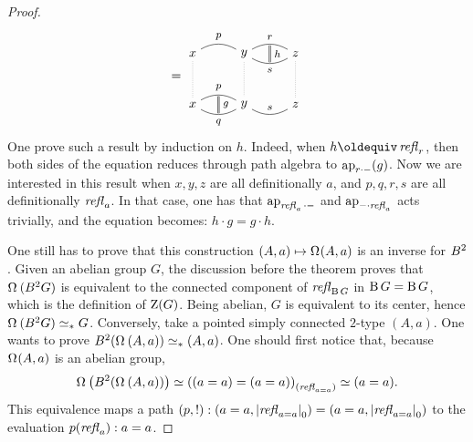 \begin{proof}
\begin{displaymath}
    =%
    \begin{tikzpicture}[node distance=4em, baseline=(basenode.base)]
      \node[] (x1) {$x$};
      \node[right of=x1] (y1) {$y$};
      \node[right of=y1] (z1) {$z$};
      \node[below of=x1] (x2) {$x$};
      \node[right of=x2] (y2) {$y$};
      \node[right of=y2] (z2) {$z$};
      \draw[bend left] (x2) to node[above] (p) {\footnotesize$p$} (y2);
      \draw[bend right] (x2) to  node[below] (q1) {\footnotesize$q$} (y2);
      \draw[bend right] (y2) to node[above] (r1) {\footnotesize$s$} (z2);
      \draw[bend left] (y1) to node[above] (r2) {\footnotesize$r$} (z1);
      \draw[bend right] (y1) to  node[below] (s) {\footnotesize$s$} (z1);
      \draw[bend left] (x1) to node[above] (p2) {\footnotesize$p$} (y1);
      \draw[double, shorten >=.1em, shorten <=.1em] (p) to node[right] {\footnotesize$g$} (q1);
      \draw[double, shorten >=.1em, shorten <=.1em] (r2) to node[right] {\footnotesize$h$} (s);
      \draw[gray,densely dotted] (x1) to node (basenode){} (x2) (y1) to (y2) (z1) to (z2);
    \end{tikzpicture}%
  \end{displaymath}
  One prove such a result by induction on $h$. Indeed, when
  $h\jdeq \refl r$, then both sides of the equation reduces through
  path algebra to $\mathop{\mathrm{ap}_{r\cdot{-}}} (g)$. Now we are interested in
  this result when $x,y,z$ are all definitionally $a$, and $p,q,r,s$
  are all definitionally $\mathop{\mathit{refl}_{a}}$. In that case, one has that
  $\mathop{\mathrm{ap}_{\mathop{\mathit{refl}_{a}}\cdot {-}}}$ and $\mathop{\mathrm{ap}_{{-}\cdot\mathop{\mathit{refl}_{a}}}}$ acts
  trivially, and the equation becomes: $h\cdot g = g \cdot h$.

  One still has to prove that this construction
  $(A,a) \mapsto \loopspace (A,a)$ is an inverse for $B^2$. Given an
  abelian group $G$, the discussion before the theorem proves that
  $\loopspace {(\BB G)}$ is equivalent to the connected component of
  $\mathop{\mathit{refl}_{\operatorname{B} G}}$ in ${\operatorname{B} G}={\operatorname{B} G}$, which is the definition of
  $\operatorname{Z}(G)$. Being abelian, $G$ is equivalent to its center,
  hence $\loopspace {(\BB G)} \simeq_\ast G$. Conversely, take a
  pointed simply connected $2$-type $(A,a)$. One wants to prove
  $\BB (\loopspace {(A,a)}) \weq_\ast (A,a)$. One should first notice
  that, because $\loopspace (A,a)$ is an abelian group,
  \begin{equation}
    \label{eq:loopspace-A-abelian}%
    \loopspace \left( \BB (\loopspace {(A,a)}) \right)
    \weq \conncomp{((a=a)=(a=a))}{\refl{a=a}} \weq (a=a).
  \end{equation}
  This equivalence maps a path
  $(p,!):(a=a,{\lvert\mathop{\mathit{refl}_{a=a}}\rvert}_0)=(a=a,{\lvert\mathop{\mathit{refl}_{a=a}}\rvert}_0)$ to
  the evaluation $p(\mathop{\mathit{refl}_{a}}): a=a$.


\end{proof}
